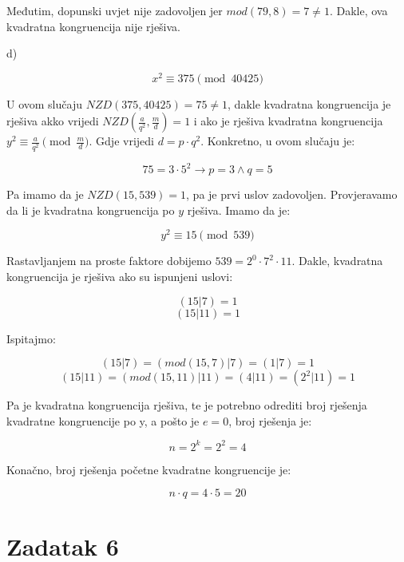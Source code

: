 \documentclass[12pt]{article}
\begin{document}
Međutim, dopunski uvjet nije zadovoljen jer $mod(79, 8) = 7 \neq 1$. Dakle, ova kvadratna kongruencija nije rješiva.

\newpage

d)

$$x^2 \equiv 375 \pmod{40425}$$\vspace{1mm}

U ovom slučaju $NZD(375, 40425) = 75 \neq 1$, dakle kvadratna kongruencija je rješiva akko vrijedi $NZD(\frac{a}{q^2}, \frac{m}{d}) = 1$ i ako je rješiva kvadratna kongruencija
$y^2 \equiv \frac{a}{q^2} \pmod{\frac{m}{d}}$. Gdje vrijedi $d = p \cdot q^2$. Konkretno, u ovom slučaju je:

$$75 = 3 \cdot 5^2 \to p = 3 \land q = 5$$\vspace{1mm}

Pa imamo da je $NZD(15, 539) = 1$, pa je prvi uslov zadovoljen. Provjeravamo da li je kvadratna kongruencija po $y$ rješiva. Imamo da je:

$$y^2 \equiv 15 \pmod{539}$$\vspace{1mm}

Rastavljanjem na proste faktore dobijemo $539 = 2^0 \cdot 7^2 \cdot 11$. Dakle, kvadratna kongruencija je rješiva ako su ispunjeni uslovi:

$$(15 | 7) = 1$$
$$(15 | 11) = 1$$

Ispitajmo:

$$(15 | 7) = (mod(15, 7) | 7) = (1 | 7) = 1$$
$$(15 | 11) = (mod(15, 11) | 11) = (4 | 11) = (2^2 | 11) = 1$$\vspace{1mm}

Pa je kvadratna kongruencija rješiva, te je potrebno odrediti broj rješenja kvadratne kongruencije po y, a pošto je $e = 0$, broj rješenja je:

$$n = 2^k = 2^2 = 4$$\vspace{1mm}

Konačno, broj rješenja početne kvadratne kongruencije je:

$$n \cdot q = 4 \cdot 5 = 20$$

\newpage

\section*{Zadatak 6\label{Z6} }
\end{document}
